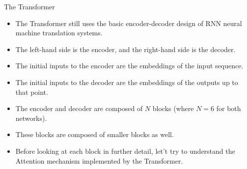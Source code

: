 \documentclass[handout]{beamer}
\begin{document}
\begin{frame}{The Transformer}
\begin{scriptsize}
\begin{itemize}

 \item  The Transformer still uses the basic encoder-decoder design of RNN neural machine translation systems.
 
 \item The left-hand side is the encoder, and the right-hand side is the decoder. 
 
 \item The initial inputs to the encoder are the embeddings of the input sequence.
 \item The initial inputs to the decoder are the embeddings of the outputs up to that point. 
 
 \item The encoder and decoder are composed of $N$ blocks (where $N = 6$ for both networks).
 
 \item These blocks are composed of smaller blocks as well. 
 
 \item Before looking at each block in further detail, let't try to understand the Attention mechanism implemented by the Transformer.
 
\end{itemize}

\end{scriptsize}

\end{frame}
\end{document}
